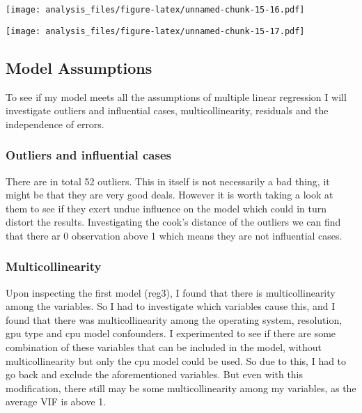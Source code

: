 \documentclass[
]{article}
\newenvironment{Shaded}{\begin{snugshade}}{\end{snugshade}}
\newcommand{\KeywordTok}[1]{\textcolor[rgb]{0.13,0.29,0.53}{\textbf{#1}}}
\newcommand{\NormalTok}[1]{#1}
\newcommand{\OperatorTok}[1]{\textcolor[rgb]{0.81,0.36,0.00}{\textbf{#1}}}
\begin{document}
\texttt{[image: analysis\_files/figure-latex/unnamed-chunk-15-16.pdf]}

\begin{Shaded}
\end{Shaded}

\texttt{[image: analysis\_files/figure-latex/unnamed-chunk-15-17.pdf]}

\hypertarget{model-assumptions}{%
\subsection{Model Assumptions}\label{model-assumptions}}

To see if my model meets all the assumptions of multiple linear
regression I will investigate outliers and influential cases,
multicollinearity, residuals and the independence of errors.

\hypertarget{outliers-and-influential-cases}{%
\subsubsection{Outliers and influential
cases}\label{outliers-and-influential-cases}}

There are in total 52 outliers. This in itself is not necessarily a bad
thing, it might be that they are very good deals. However it is worth
taking a look at them to see if they exert undue influence on the model
which could in turn distort the results. Investigating the cook's
distance of the outliers we can find that there ar 0 observation above 1
which means they are not influential cases.

\hypertarget{multicollinearity}{%
\subsubsection{Multicollinearity}\label{multicollinearity}}

Upon inspecting the first model (reg3), I found that there is
multicollinearity among the variables. So I had to investigate which
variables cause this, and I found that there was multicollinearity among
the operating system, resolution, gpu type and cpu model confounders. I
experimented to see if there are some combination of these variables
that can be included in the model, without multicollinearity but only
the cpu model could be used. So due to this, I had to go back and
exclude the aforementioned variables. But even with this modification,
there still may be some multicollinearity among my variables, as the
average VIF is above 1.
\end{document}
